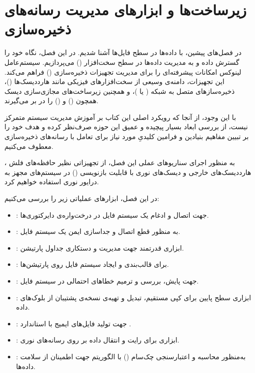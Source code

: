 \chapter{زیرساخت‌ها و ابزارهای مدیریت رسانه‌های ذخیره‌سازی}

در فصل‌های پیشین، با داده‌ها در سطح فایل‌ها آشنا شدیم. در این فصل، نگاه خود را گسترش داده و به مدیریت داده‌ها در سطح سخت‌افزار () می‌پردازیم. سیستم‌عامل لینوکس امکانات پیشرفته‌ای را برای مدیریت تجهیزات ذخیره‌سازی () فراهم می‌کند. این تجهیزات، دامنه‌ی وسیعی از سخت‌افزارهای فیزیکی مانند هارددیسک‌ها ()، ذخیره‌سازهای متصل به شبکه ( یا )، و همچنین زیرساخت‌های مجازی‌سازی دیسک همچون  () و  () را در بر می‌گیرند.

با این وجود، از آنجا که رویکرد اصلی این کتاب بر آموزش مدیریت سیستم متمرکز نیست، از بررسی ابعاد بسیار پیچیده و عمیق این حوزه صرف‌نظر کرده و هدف خود را بر تبیین مفاهیم بنیادین و فرامین کلیدیِ مورد نیاز برای تعامل با رسانه‌های ذخیره‌سازی معطوف می‌کنیم.

به منظور اجرای سناریوهای عملی این فصل، از تجهیزاتی نظیر حافظه‌های فلش ، هارددیسک‌های خارجی و دیسک‌های نوری با قابلیت بازنویسی () در سیستم‌های مجهز به درایور نوری استفاده خواهیم کرد.

در این فصل، ابزارهای عملیاتی زیر را بررسی می‌کنیم:

\begin{itemize}
  \item {}: جهت اتصال و ادغام یک سیستم فایل در درخت‌واره‌ی دایرکتوری‌ها.
  \item {}: به منظور قطع اتصال و جداسازی ایمن یک سیستم فایل.
  \item {}: ابزاری قدرتمند جهت مدیریت و دستکاری جداول پارتیشن.
  \item {}: برای قالب‌بندی و ایجاد سیستم فایل روی پارتیشن‌ها.
  \item {}: جهت پایش، بررسی و ترمیم خطاهای احتمالی در سیستم فایل.
  \item {}: ابزاری سطح پایین برای کپی مستقیم، تبدیل و تهیه‌ی نسخه‌ی پشتیبان از بلوک‌های داده.
  \item {}: جهت تولید فایل‌های ایمیج با استاندارد .
  \item {}: ابزاری برای رایت و انتقال داده بر روی رسانه‌های نوری.
  \item {}: به‌منظور محاسبه و اعتبارسنجی چک‌سام () با الگوریتم  جهت اطمینان از سلامت داده‌ها.
\end{itemize}

